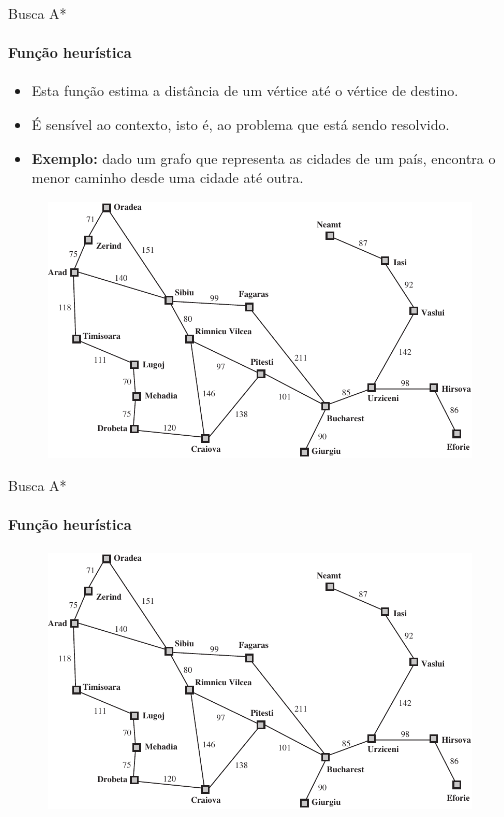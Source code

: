 \begin{frame}[b]{Busca A*}
\framesubtitle{Função heurística}

\begin{itemize}
	\item Esta função estima a distância de um vértice até o vértice de destino.
	\item É sensível ao contexto, isto é, ao problema que está sendo resolvido.
	\pause
	\item \textbf{Exemplo:} dado um grafo que representa as cidades de um país, encontra o menor caminho desde uma cidade até outra.
\end{itemize}

\begin{figure}
	\centering
	\includegraphics[width=0.7\linewidth]{img/grafo-cidades-roteamento}
\end{figure}
\end{frame}



\begin{frame}[b]{Busca A*}
\framesubtitle{Função heurística}

\begin{itemize}

\end{itemize}

\begin{figure}
	\centering
	\includegraphics[width=0.7\linewidth]{img/grafo-cidades-roteamento}
\end{figure}
\end{frame}



